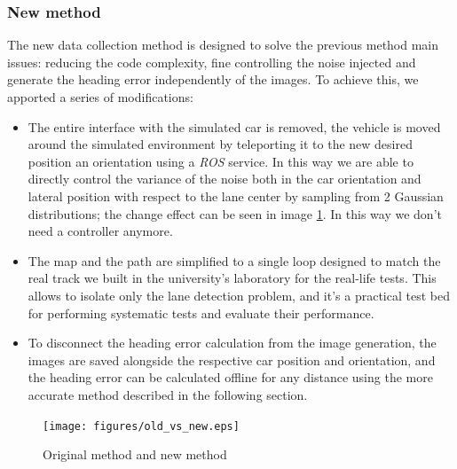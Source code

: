 \documentclass[a4paper,12pt,sort&compress]{article}
\begin{document}
\subsubsection*{New method}
The new data collection method is designed to solve the previous method main issues: reducing the
code complexity, fine controlling the noise injected and generate the heading error independently of
the images. To achieve this, we apported a series of modifications:
\begin{itemize}
    \item The entire interface with the simulated car is removed, the vehicle is moved around the
    simulated environment by teleporting it to the new desired position an orientation using a
    \textit{ROS} service. In this way we are able to directly control the variance of the noise both
    in the car orientation and lateral position with respect to the lane center by sampling from 2
    Gaussian distributions; the change effect can be seen in image \ref*{fig:original_vs_old}. In
    this way we don't  need a controller anymore.
    \item The map and the path are simplified to a single loop designed to match the real track we
    built in the university's laboratory for the real-life tests. This allows to isolate only the
    lane detection problem, and it's a practical test bed for performing systematic tests and
    evaluate their performance. 
    \item To disconnect the heading error calculation from the image generation, the images are
    saved alongside the respective car position and orientation, and the heading error can be
    calculated offline for any distance using the more accurate method described in the following
    section.   
\end{itemize}


\begin{figure}
    \centering
    \texttt{[image: figures/old\_vs\_new.eps]}
    \caption{Original method and new method}
    \label{fig:original_vs_old}
\end{figure}

\end{document}
